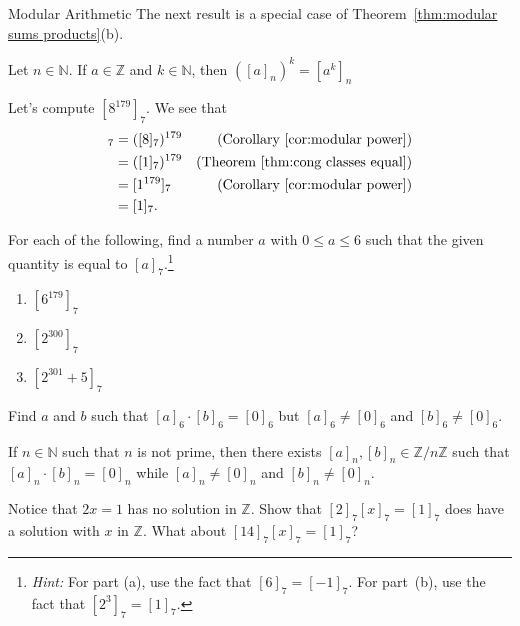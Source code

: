 \begin{section}{Modular Arithmetic}
The next result is a special case of Theorem~\ref{thm:modular sums products}(b).

\begin{corollary}\label{cor:modular power}
Let $n\in \mathbb{N}$. If $a\in\mathbb{Z}$ and $k\in \mathbb{N}$, then $([a]_n)^k = [a^k]_n$
\end{corollary}

\begin{example}
Let's compute $[8^{179}]_7$.  We see that
\begin{align*}
[8^{179}]_7 & = ([8]_7)^{179} & (\text{Corollary~\ref{cor:modular power}})\\
& = ([1]_7)^{179} & (\text{Theorem~\ref{thm:cong classes equal}})\\
& = [1^{179}]_7 & (\text{Corollary~\ref{cor:modular power}})\\
& = [1]_7.
\end{align*}
\end{example}

\begin{problem}
For each of the following, find a number $a$ with $0\le a \le 6$ such that the given quantity is equal to $[a]_7$.\footnote{\emph{Hint:} For part (a), use the fact that $[6]_7 = [-1]_7$. For part~(b), use the fact that $[2^3]_7 = [1]_7$.}
\begin{enumerate}[label=\textrm{(\alph*)}]
\item $[6^{179}]_7$
\item $[2^{300}]_7$
\item $[2^{301} +5]_7$
\end{enumerate}
\end{problem}

\begin{problem}
Find $a$ and $b$ such that $[a]_6\cdot[b]_6 = [0]_6$ but $[a]_6 \neq [0]_6$ and $[b]_6 \neq [0]_6$. %
\end{problem}

\begin{theorem}
If $n\in \mathbb{N}$ such that $n$ is not prime, then there exists $[a]_n, [b]_n \in \mathbb{Z}/n\mathbb{Z}$ such that $[a]_n\cdot[b]_n = [0]_n$ while $[a]_n \neq [0]_n$ and $[b]_n \neq [0]_n$.
\end{theorem}

\begin{problem}
Notice that $2x = 1$ has no solution in $\mathbb{Z}$. Show that $[2]_7[x]_7 = [1]_7$ does have a solution with $x$ in $\mathbb{Z}$. What about $[14]_7[x]_7 = [1]_7$?
\end{problem}


\end{section}
